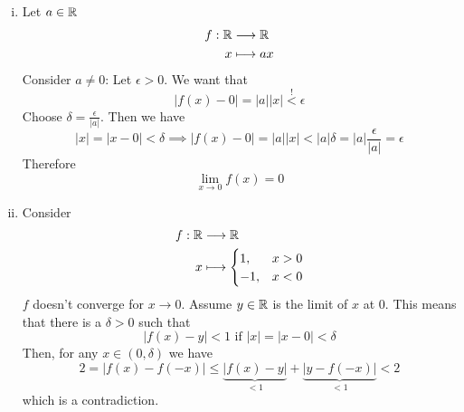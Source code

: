 \documentclass[../script.tex]{subfiles}
\begin{document}
\begin{eg}
\begin{enumerate}[(i)]
    \item Let $a \in \mathbb{R}$
    \begin{align*}
        f: \mathbb{R} &\longrightarrow \mathbb{R} \\
        x &\longmapsto ax
    \end{align*}
    Consider $a \ne 0$: Let $\epsilon > 0$. We want that 
    \[
        |f(x) - 0| = |a||x| \stackrel{!}{<} \epsilon
    \]
    Choose $\delta = \frac{\epsilon}{|a|}$. Then we have 
    \[
        |x| = |x - 0| < \delta \implies |f(x) - 0| = |a||x| < |a| \delta = |a| \frac{\epsilon}{|a|} = \epsilon
    \]
    Therefore 
    \[
        \lim_{x \rightarrow 0} f(x) = 0
    \]

    \item Consider 
    \begin{align*}
        f: \mathbb{R} &\longrightarrow \mathbb{R} \\
        x &\longmapsto \begin{cases}
            1 ,& x > 0 \\
            -1 ,& x < 0 \\
        \end{cases}
    \end{align*}
    $f$ doesn't converge for $x \rightarrow 0$. Assume $y \in \mathbb{R}$ is the limit of $x$ at $0$. This means that there is a $\delta > 0$ such that
    \[
        |f(x) - y| < 1 \text{ if } |x| = |x - 0| < \delta
    \]
    Then, for any $x \in (0, \delta)$ we have 
    \[
        2 = |f(x) - f(-x)| \le \underbrace{|f(x) - y|}_{< 1} + \underbrace{|y - f(-x)|}_{< 1} < 2
    \]
    which is a contradiction.
\end{enumerate}
\end{eg}
\end{document}
